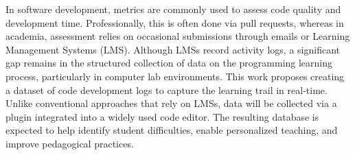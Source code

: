 
\begin{abstractutfpr}%
In software development, metrics are commonly used to assess code quality and development time. Professionally, this is often done via pull requests, whereas in academia, assessment relies on occasional submissions through emails or Learning Management Systems (LMS). Although LMSs record activity logs, a significant gap remains in the structured collection of data on the programming learning process, particularly in computer lab environments. This work proposes creating a dataset of code development logs to capture the learning trail in real-time. Unlike conventional approaches that rely on LMSs, data will be collected via a plugin integrated into a widely used code editor. The resulting database is expected to help identify student difficulties, enable personalized teaching, and improve pedagogical practices.

\end{abstractutfpr}
